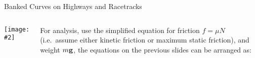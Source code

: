 \documentclass[12pt,compress,aspectratio=169]{beamer}
\newcommand{\pic}[2]{\texttt{[image: \#2]}}
\newcommand{\mb}[1]{\ensuremath\mathbf{#1}}
\begin{document}
\begin{frame}{Banked Curves on Highways and Racetracks}
  \begin{columns}
    \centering
    \pic{.8}{banked-turn-acceleration}\\

    For analysis, use the simplified equation for friction $f=\mu N$ (i.e.\
    assume either kinetic friction or maximum static friction), and weight
    $m\mb{g}$, the equations on the previous slides can be arranged as:

  \end{columns}
\end{frame}
\end{document}
